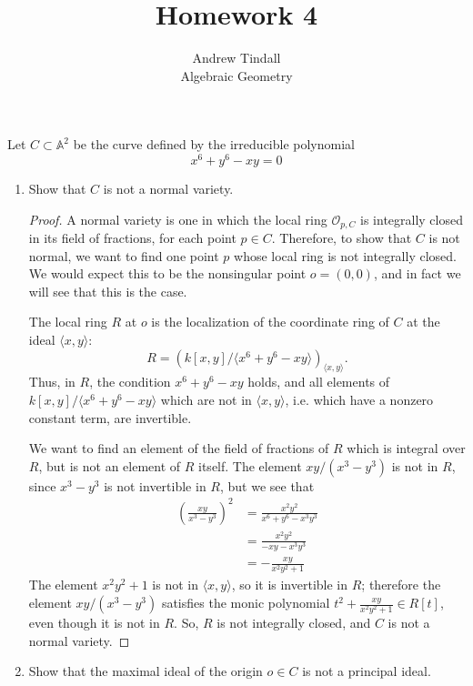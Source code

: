 \documentclass[12pt]{article}
\theoremstyle{definition}
\newenvironment{problem}[2][Problem]{\begin{trivlist}
\item[\hskip \labelsep {\bfseries #1}\hskip \labelsep {\bfseries #2.}]}{\end{trivlist}}
\begin{document}
 
 
\title{Homework 4}
\author{Andrew Tindall\\ Algebraic Geometry}
 
\maketitle
\begin{problem}{1}
	Let $C \subset \mathbb A^2$ be the curve defined by the irreducible polynomial 
	\[x^6 + y^6 - xy = 0\]
		\begin{enumerate}
			\item Show that $C$ is not a normal variety.
				\begin{proof}
					A normal variety is one in which the local ring $\mathcal{O}_{p, C}$ is integrally closed in its field of fractions, for each point $p \in C$. Therefore, to show that $C$ is not normal, we want to find one point $p$ whose local ring is not integrally closed. We would expect this to be the nonsingular point $o = (0,0)$, and in fact we will see that this is the case.
					\par The local ring $R$ at  $o$ is the localization of the coordinate ring of $C$ at the ideal $\langle x, y\rangle$:
					\[R = (k[x,y]/ \langle x^6 + y^6 - xy\rangle)_{\langle x, y\rangle}.\]
					Thus, in $R$, the condition $x^6 + y^6 - xy$ holds, and all elements of $k[x,y]/ \langle x^6 + y^6 - xy\rangle$ which are not in $\langle x, y\rangle$, i.e. which have a nonzero constant term, are invertible. 
					\par We want to find an element of the field of fractions of $R$ which is integral over $R$, but is not an element of $R$ itself. The element $xy/(x^3 - y^3)$ is not in $R$, since $x^3 - y^3$ is not invertible in $R$, but we see that
					\begin{align*}
						\left( \frac{xy}{x^3 - y^3} \right)^2 &= \frac{x^2y^2}{x^6 + y^6 - x^3y^3}\\
						&= \frac{x^2y^2}{-xy - x^3y^3}\\
						&= - \frac{xy}{x^2y^2 + 1}
					\end{align*}
					The element $x^2y^2 + 1$ is not in $\langle x, y\rangle$, so it is invertible in $R$; therefore the element $xy / (x^3 - y^3)$ satisfies the monic polynomial $t^2 + \frac{xy}{x^2y^2 +1} \in R[t]$, even though it is not in $R$. So, $R$ is not integrally closed, and $C$ is not a normal variety.
				\end{proof}
			\item Show that the maximal ideal of the origin $o \in C$ is not a principal ideal.

\end{enumerate}
\end{problem}
\end{document}
